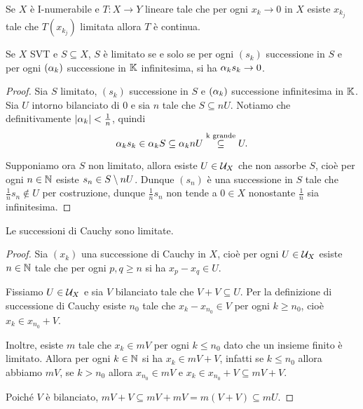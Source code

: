 \begin{exercise}
Se $X$ \`e I-numerabile e $T:X\to Y$ lineare tale che per ogni $x_k\to 0$ in $X$ esiste $x_{k_j}$ tale che $T(x_{k_j})$ limitata allora $T$ \`e continua.
\end{exercise}

\begin{proposition}\label{PrCaratterizzazioneSequenzialeLimitatezza}
Se $X$ SVT e $S\subseteq X$, $S$ \`e limitato se e solo se per ogni $(s_k)$ successione in $S$ e per ogni $(\alpha_k)$ successione in $\mathbb{K}$ infinitesima, si ha $\alpha_k s_k\to 0$.
\end{proposition}
\begin{proof}
Sia $S$ limitato, $(s_k)$ successione in $S$ e $(\alpha_k)$ successione infinitesima in $\mathbb{K}$. Sia $U$ intorno bilanciato di $0$ e sia $n$ tale che $S\subseteq nU$. Notiamo che definitivamente $\left|{\alpha_k}\right|<\frac1n$, quindi
\[\alpha_k s_k\in \alpha_k S\subseteq \alpha_k nU\overset{\text{k grande}}{\subseteq} U.\]

Supponiamo ora $S$ non limitato, allora esiste $U\in\mathcal{U}_X$ che non assorbe $S$, cio\`e per ogni $n\in\mathbb{N}$ esiste $s_n\in S\setminus nU$. Dunque $(s_n)$ \`e una successione in $S$ tale che $\frac1n s_n\notin U$ per costruzione, dunque $\frac1n s_n$ non tende a $0\in X$ nonostante $\frac1n$ sia infinitesima.
\end{proof}

\begin{proposition}\label{PrSuccessioniCauchyLimitate}
Le successioni di Cauchy sono limitate.
\end{proposition}
\begin{proof}
Sia $(x_k)$ una successione di Cauchy in $X$, cio\`e per ogni $U\in \mathcal{U}_X$ esiste $n\in\mathbb{N}$ tale che per ogni $p,q\geq n$ si ha $x_p-x_q\in U$.

Fissiamo $U\in \mathcal{U}_X$ e sia $V$ bilanciato tale che $V+V\subseteq U$. Per la definizione di successione di Cauchy esiste $n_0$ tale che $x_k-x_{n_0}\in V$ per ogni $k\geq n_0$, cio\`e $x_k\in x_{n_0}+V$.

Inoltre, esiste $m$ tale che $x_k\in mV$ per ogni $k\leq n_0$ dato che un insieme finito \`e limitato. Allora per ogni $k\in\mathbb{N}$ si ha $x_k\in mV+V$, infatti se $k\leq n_0$ allora abbiamo $mV$, se $k>n_0$ allora $x_{n_0}\in mV$ e $x_k\in x_{n_0}+V\subseteq mV+V$.

Poich\'e $V$ \`e bilanciato, $mV+V\subseteq mV+mV=m(V+V)\subseteq mU$.
\end{proof}

